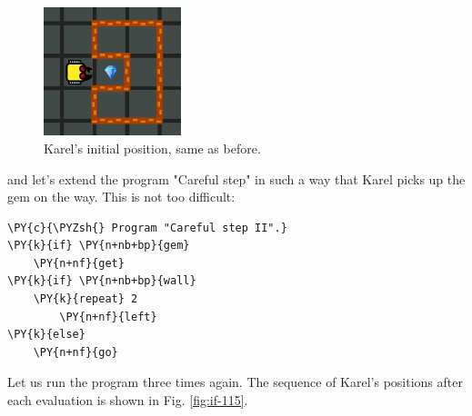 \begin{figure}[!ht]
\begin{center}
\includegraphics[width=4cm]{img/if-111.png}
\vspace{-0mm}
\caption{Karel's initial position, same as before.}
\label{fig:if-111b}
\vspace{-6mm}
\end{center}
\end{figure}
\noindent
and let's extend 
the program "Careful step" in such a way that Karel picks up the gem on
the way. This is not too difficult:\\

\begin{bbox}
\begin{Verbatim}[commandchars=\\\{\}]
\PY{c}{\PYZsh{} Program "Careful step II".}
\PY{k}{if} \PY{n+nb+bp}{gem}
    \PY{n+nf}{get}
\PY{k}{if} \PY{n+nb+bp}{wall}
    \PY{k}{repeat} 2
        \PY{n+nf}{left}
\PY{k}{else}
    \PY{n+nf}{go}
\end{Verbatim}
\end{bbox}
\vspace{6mm}

\noindent
Let us run the program three times again. The sequence of Karel's positions 
after each evaluation is shown in Fig. \ref{fig:if-115}.
\newpage


